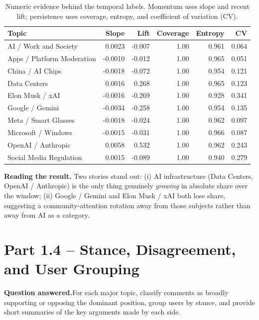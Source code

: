 \documentclass[11pt,a4paper]{article}
\newcommand{\questionanswered}[1]{%
  \par\medskip\noindent\textbf{Question answered.}\quad #1\par\medskip%
}
\begin{document}
\begin{table}[H]
\centering
\small
\caption{Numeric evidence behind the temporal labels. Momentum uses slope and recent lift; persistence
uses coverage, entropy, and coefficient of variation (CV).}
\label{tab:temporal-metrics}
\renewcommand{\arraystretch}{1.12}
\begin{tabular}{l r r r r r}
\toprule
\textbf{Topic} & \textbf{Slope} & \textbf{Lift} & \textbf{Coverage} & \textbf{Entropy} & \textbf{CV} \\
\midrule
AI / Work and Society & 0.0023 & -0.007 & 1.00 & 0.961 & 0.064 \\
Apps / Platform Moderation & -0.0010 & -0.012 & 1.00 & 0.965 & 0.051 \\
China / AI Chips & -0.0018 & -0.072 & 1.00 & 0.954 & 0.121 \\
Data Centers & 0.0016 & 0.268 & 1.00 & 0.965 & 0.123 \\
Elon Musk / xAI & -0.0016 & -0.269 & 1.00 & 0.928 & 0.341 \\
Google / Gemini & -0.0034 & -0.258 & 1.00 & 0.954 & 0.135 \\
Meta / Smart Glasses & -0.0018 & -0.024 & 1.00 & 0.962 & 0.097 \\
Microsoft / Windows & -0.0015 & -0.031 & 1.00 & 0.966 & 0.087 \\
OpenAI / Anthropic & 0.0058 & 0.532 & 1.00 & 0.962 & 0.243 \\
Social Media Regulation & 0.0015 & -0.089 & 1.00 & 0.940 & 0.279 \\
\bottomrule
\end{tabular}
\end{table}

\textbf{Reading the result.} Two stories stand out: (i) AI infrastructure (Data Centers, OpenAI /
Anthropic) is the only thing genuinely \emph{growing} in absolute share over the window;
(ii) Google / Gemini and Elon Musk / xAI both lose share, suggesting a community-attention
rotation away from those subjects rather than away from AI as a category.

\section{Part 1.4 -- Stance, Disagreement, and User Grouping}
\label{sec:14}

\questionanswered{For each major topic, classify comments as broadly supporting or opposing the
dominant position, group users by stance, and provide short summaries of the key arguments made
by each side.}
\end{document}
